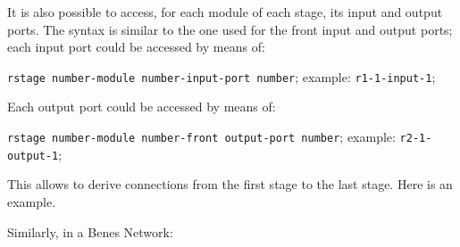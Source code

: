\documentclass{ltxdoc} %
\begin{document}
It is also possible to access, for each module of each stage, its input and output ports. The syntax is similar to the one used for the front input and output ports; each input port could be accessed by means of:
\begin{flushleft}
\verb|r|\bgroup\color{red!75!black}\verb|stage number|\egroup\verb|-|\bgroup\color{red!75!black}\verb|module number|\egroup\verb|-|\bgroup\color{red!75!black}\verb|input|\egroup\verb|-|\bgroup\color{red!75!black}\verb|port number|\egroup; example: \verb|r1-1-input-1|;
\end{flushleft}
Each output port could be accessed by means of:
\begin{flushleft}
\verb|r|\bgroup\color{red!75!black}\verb|stage number|\egroup\verb|-|\bgroup\color{red!75!black}\verb|module number|\egroup\verb|-|\bgroup\color{red!75!black}\verb|front output|\egroup\verb|-|\bgroup\color{red!75!black}\verb|port number|\egroup; example: \verb|r2-1-output-1|;
\end{flushleft}
This allows to derive connections from the first stage to the last stage. Here is an example. 

\begin{codeexample}[]
\end{codeexample}
Similarly, in a Benes Network:

\begin{codeexample}[]
\end{codeexample}



\end{document}
